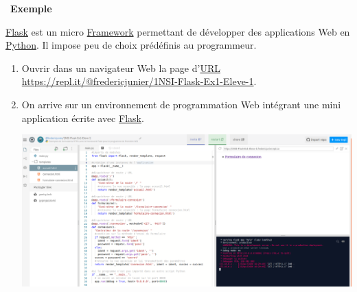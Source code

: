 \documentclass[
  11pt,
]{article}
\newcounter{def}
\newcounter{exple}
\newenvironment{exemple}[1]
{\par \medskip   \addtocounter{exple}{1} \noindent  
\begin{bclogo}[arrondi =0.1,   noborder = true, logo=\bclampe, marge=4]{~\textbf{Exemple} \textbf{\theexple} {\itshape #1} }  \par}
{
\end{bclogo}
 \par \bigskip }
\newcounter{prog}
\begin{document}
\begin{exemple}{}

\href{https://flask.palletsprojects.com/en/1.1.x/}{Flask} est un micro
\href{https://fr.wikipedia.org/wiki/Framework}{Framework} permettant de
développer des applications Web en
\href{https://docs.python.org/3.7/library/cgi.html}{Python}. Il impose
peu de choix prédéfinis au programmeur.

\begin{enumerate}
\def\labelenumi{\arabic{enumi}.}
\item
  Ouvrir dans un navigateur Web la page
  d'\href{https://developer.mozilla.org/fr/docs/Glossaire/URL}{URL}
  \url{https://repl.it/@fredericjunier/1NSI-Flask-Ex1-Eleve-1}.
\item
  On arrive sur un environnement de programmation Web intégrant une mini
  application écrite avec
  \href{https://flask.palletsprojects.com/en/1.1.x/}{Flask}.

  \includegraphics{images/flask-exemple1.png}\\


\end{enumerate}
\end{exemple}
\end{document}
